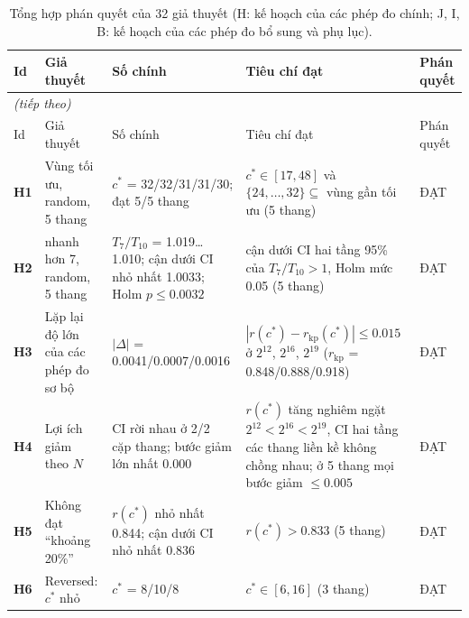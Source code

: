 \footnotesize\setlength{\tabcolsep}{4pt}
\begin{longtable}{l>{\raggedright\arraybackslash}p{3.2cm}>{\raggedright\arraybackslash}p{4.2cm}>{\raggedright\arraybackslash}p{4.3cm}>{\raggedright\arraybackslash}p{1.8cm}}
\caption{Tổng hợp phán quyết của 32 giả thuyết (H: kế hoạch của các phép đo chính; J, I, B: kế hoạch của các phép đo bổ sung và phụ lục).}\label{tab:verdicts}\\
\toprule
Id & Giả thuyết & Số chính & Tiêu chí đạt & Phán quyết \\
\midrule
\endfirsthead
\multicolumn{5}{l}{\textit{(tiếp theo)}}\\
\toprule
Id & Giả thuyết & Số chính & Tiêu chí đạt & Phán quyết \\
\midrule
\endhead
\bottomrule
\endlastfoot
\textbf{H1} & Vùng tối ưu, random, 5 thang & $c^*$ = 32/32/31/31/30; đạt 5/5 thang & $c^*\in[17,48]$ và $\{24,\dots,32\}\subseteq$ vùng gần tối ưu (5 thang) & ĐẠT \\
\textbf{H2} & 10 nhanh hơn 7, random, 5 thang & $T_7/T_{10}$ = 1.019…1.010; cận dưới CI nhỏ nhất 1.0033; Holm $p\le0.0032$ & cận dưới CI hai tầng 95\% của $T_7/T_{10}>1$, Holm mức 0.05 (5 thang) & ĐẠT \\
\textbf{H3} & Lặp lại độ lớn của các phép đo sơ bộ & $|\Delta|$ = 0.0041/0.0007/0.0016 & $|r(c^*)-r_{\mathrm{kp}}(c^*)|\le0.015$ ở $2^{12}$, $2^{16}$, $2^{19}$ ($r_{\mathrm{kp}}$ = 0.848/0.888/0.918) & ĐẠT \\
\textbf{H4} & Lợi ích giảm theo $N$ & CI rời nhau ở 2/2 cặp thang; bước giảm lớn nhất 0.000 & $r(c^*)$ tăng nghiêm ngặt $2^{12}<2^{16}<2^{19}$, CI hai tầng các thang liền kề không chồng nhau; ở 5 thang mọi bước giảm $\le0.005$ & ĐẠT \\
\textbf{H5} & Không đạt ``khoảng 20\%'' & $r(c^*)$ nhỏ nhất 0.844; cận dưới CI nhỏ nhất 0.836 & $r(c^*)>0.833$ (5 thang) & ĐẠT \\
\textbf{H6} & Reversed: $c^*$ nhỏ & $c^*$ = 8/10/8 & $c^*\in[6,16]$ (3 thang) & ĐẠT \\

\end{longtable}
